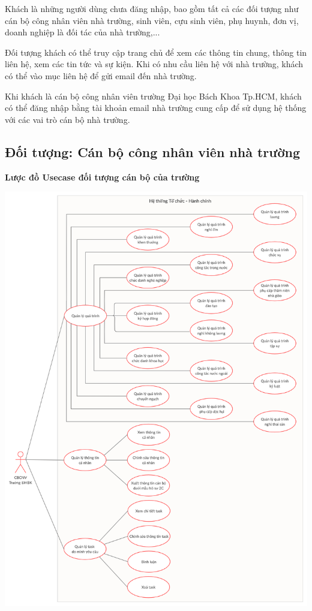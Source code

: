 Khách là những người dùng chưa đăng nhập, bao gồm tất cả các đối tượng như cán bộ công nhân viên nhà trường, sinh viên, cựu sinh viên, phụ huynh, đơn vị, doanh nghiệp là đối tác của nhà trường,...
 
 Đối tượng khách có thể truy cập trang chủ để xem các thông tin chung, thông tin liên hệ, xem các tin tức và sự kiện. Khi có nhu cầu liên hệ với nhà trường, khách có thể vào mục liên hệ để gửi email đến nhà trường.
 
 Khi khách là cán bộ công nhân viên trường Đại học Bách Khoa Tp.HCM, khách có thể đăng nhập bằng tài khoản email nhà trường cung cấp để sử dụng hệ thống với các vai trò cán bộ nhà trường.

\subsection{Đối tượng: Cán bộ công nhân viên nhà trường}
\textbf{Lược đồ Usecase đối tượng cán bộ của trường}
\begin{center}
  \captionsetup{type=figure}
  \includegraphics[width=15cm]{img/usecase/userUsecase.png}
\end{center}

